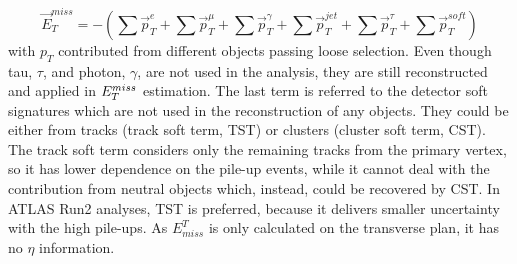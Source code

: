 \begin{equation}
\vec{E}_{T}^{miss} = -(\sum \vec{p}_{T}^{e} +\sum \vec{p}_{T}^{\mu} +\sum \vec{p}_{T}^{\gamma} +\sum \vec{p}_{T}^{jet} +\sum \vec{p}_{T}^{\tau}+\sum \vec{p}_{T}^{soft})
\end{equation}
with $p_{T}$ contributed from different objects passing loose selection. Even though tau, $\tau$, and photon, $\gamma$, are not used in the analysis, they are still reconstructed and applied in $E_{T}^{miss}$ estimation.  The last term is referred to the detector soft signatures which are not used in the reconstruction of any objects. They could be either from tracks (track soft term, TST) or clusters (cluster soft term, CST). The track soft term considers only the remaining tracks from the primary vertex, so it has lower dependence on the pile-up events, while it cannot deal with the contribution from neutral objects which, instead, could be recovered by CST. In ATLAS Run2 analyses, TST is preferred, because it delivers smaller uncertainty with the high pile-ups. As $E^{T}_{miss}$ is only calculated on the transverse plan, it has no $\eta$ information. 

